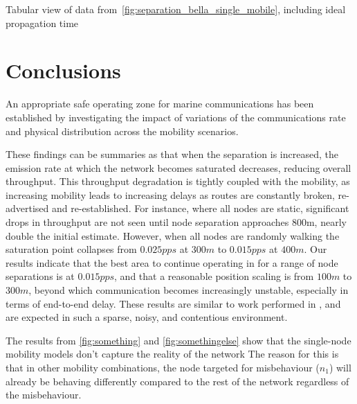 \begin{table}[h]
	\caption{Tabular view of data from~\autoref{fig:separation_bella_single_mobile}, including ideal propagation time} \label{tab:separation_bella_single_mobile}
	\begin{center}
    
	\end{center}
\end{table}


\section{Conclusions}

An appropriate safe operating zone for marine communications has been established by investigating the impact of variations of the communications rate and physical distribution across the mobility scenarios.

These findings can be summaries as that when the separation is increased, the emission rate at which the network becomes saturated decreases, reducing overall throughput. 
This throughput degradation is tightly coupled with the mobility, as increasing mobility leads to increasing delays as routes are constantly broken, re-advertised and re-established. 
For instance, where all nodes are static, significant drops in throughput are not seen until node separation approaches 800m, nearly double the initial estimate. 
However, when all nodes are randomly walking the saturation point collapses from $0.025pps$ at $300m$ to $0.015pps$ at $400m$.
Our results indicate that the best area to continue operating in for a range of node separations is at $0.015pps$, and that a reasonable position scaling is from $100m$ to $300m$, beyond which communication becomes increasingly unstable, especially in terms of end-to-end delay.
These results are similar to work performed in \cite{Miquel2008}, and are expected in such a sparse, noisy, and contentious environment. 



The results from \autoref{fig:something} and \autoref{fig:somethingelse} show that the single-node mobility models don't capture the reality of the network 
The reason for this is that in other mobility combinations, the node targeted for misbehaviour ($n_1$) will already be behaving differently compared to the rest of the network regardless of the misbehaviour.

